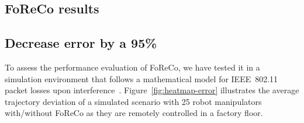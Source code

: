 \documentclass[a0,portrait]{a0poster}
\begin{document}
\begin{multicols}{2}


\color{DarkSlateGray} %


\section*{FoReCo results}
\subsection*{Decrease error by a 95\%}
To assess the performance evaluation of FoReCo,
we have tested it in a simulation environment that
follows a mathematical model for IEEE~802.11 packet
losses upon interference~\cite{foreco}.
Figure~\ref{fig:heatmap-error} illustrates the average
trajectory deviation of a simulated scenario
with 25 robot manipulators with/without FoReCo
as they are remotely controlled in a factory floor.


\end{multicols}
\end{document}
